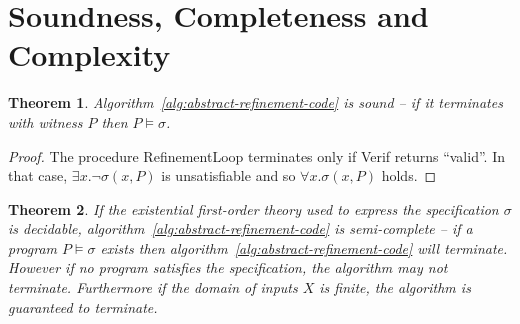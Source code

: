\documentclass[preprint]{sigplanconf}
\newtheorem{theorem}{Theorem}
\newtheorem{conjecture}[theorem]{Conjecture}
\theoremstyle{definition}
\begin{document}
\iffalse
We begin by observing that the asymptotic complexity of all of our synthesis
backends are equal, assuming $P \neq NP$.  This complexity is:

$$O\left(2^{K(f)}\right)$$

Where $K(f)$ is the Kolmogorov complexity of $f$, which is $O(\log Y^X) = O(X)$
so the complexity is doubly exponential in the width of $X$.


\begin{theorem}
 Fitness landscapes form a lattice.  Adding test vectors corresponds to abstraction refinement on this
 lattice, which is why incremental GP works well.
\end{theorem}

\begin{proof}
 Trivial.
\end{proof}


\begin{conjecture}
 A single fitness landscape isn't really very smooth (e.g. small changes in program representation
 don't correspond to small changes in fitness), so GP probably shouldn't work very well.

 But it does.
\end{conjecture}
\fi


\section{Soundness, Completeness and Complexity}
\begin{theorem}
 \label{thm:synth-sound}
 Algorithm~\ref{alg:abstract-refinement-code} is sound -- if it terminates with witness $P$ then
 $P \models \sigma$.
\end{theorem}

\begin{proof}
 The procedure {\sc RefinementLoop} terminates only if {\sc Verif} returns ``valid''.  In that
 case, $\exists x . \lnot \sigma(x, P)$ is unsatisfiable and so $\forall x . \sigma(x, P)$ holds.
\end{proof}

\begin{theorem}
 \label{thm:synth-semicomplete}
 If the existential first-order theory used to express the specification $\sigma$ is decidable,
 algorithm~\ref{alg:abstract-refinement-code} is semi-complete -- if a program $P \models \sigma$
 exists then algorithm~\ref{alg:abstract-refinement-code} will terminate.  However if no program
 satisfies the specification, the algorithm may not terminate.  Furthermore if the domain of inputs $X$
 is finite, the algorithm is guaranteed to terminate.
\end{theorem}
\end{document}
